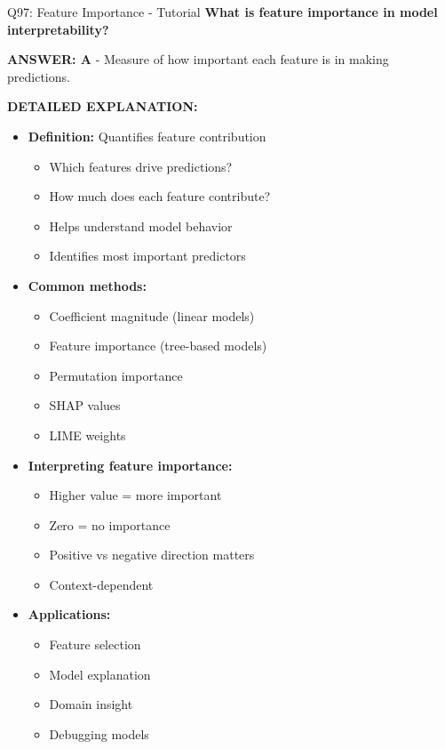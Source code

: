\documentclass[8pt]{beamer}
\begin{document}
	\begin{frame}{Q97: Feature Importance - Tutorial}
		\fontsize{6.5}{7.5}\selectfont
		\textbf{What is feature importance in model interpretability?}
		
		\vspace{0.05cm}
		\textcolor{myblue}{\textbf{ANSWER: A}} - Measure of how important each feature is in making predictions.
		
		\vspace{0.05cm}
		\textbf{DETAILED EXPLANATION:}
		\begin{itemize}
			\item \textbf{Definition:} Quantifies feature contribution
			\begin{itemize}
				\item Which features drive predictions?
				\item How much does each feature contribute?
				\item Helps understand model behavior
				\item Identifies most important predictors
			\end{itemize}
			\item \textbf{Common methods:}
			\begin{itemize}
				\item Coefficient magnitude (linear models)
				\item Feature importance (tree-based models)
				\item Permutation importance
				\item SHAP values
				\item LIME weights
			\end{itemize}
			\item \textbf{Interpreting feature importance:}
			\begin{itemize}
				\item Higher value = more important
				\item Zero = no importance
				\item Positive vs negative direction matters
				\item Context-dependent
			\end{itemize}
			\item \textbf{Applications:}
			\begin{itemize}
				\item Feature selection
				\item Model explanation
				\item Domain insight
				\item Debugging models
			\end{itemize}
		\end{itemize}
		

\end{frame}
\end{document}
